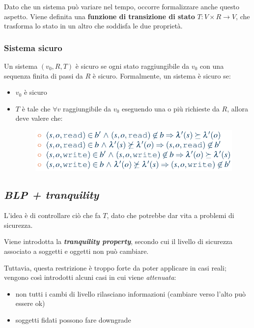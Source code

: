 \documentclass{report}
\begin{document}
\noindent Dato che un sistema può variare nel tempo, occorre formalizzare anche questo aspetto.
Viene definita una \textbf{funzione di transizione di stato} $T: V \times R \rightarrow V$, che 
trasforma lo stato in un altro che soddisfa le due proprietà.

\subsubsection{Sistema sicuro}

Un sistema $(v_0, R, T)$ è sicuro se ogni stato raggiungibile da $v_0$ con una sequenza finita di 
passi da $R$ è sicuro. Formalmente, un sistema è sicuro se:
\begin{itemize}
    \item $v_0$ è sicuro 
    \item $T$ è tale che $\forall v$ raggiungibile da $v_0$ eseguendo una o più richieste 
    da $R$, allora deve valere che:
    \begin{figure}[H]
        \centering
        \includegraphics[width=0.8\linewidth]{images/blp-ss.png}
    \end{figure}
\end{itemize}

\subsection{\textit{BLP + tranquility}}

L'idea è di controllare ciò che fa $T$, dato che potrebbe dar vita 
a problemi di sicurezza.

\noindent Viene introdotta la \textit{\textbf{tranquility property}}, secondo cui 
il livello di sicurezza associato a soggetti e oggetti non può cambiare.

\noindent Tuttavia, questa restrizione è troppo forte da poter applicare in casi reali;
vengono così introdotti alcuni casi in cui viene \textit{attenuata}:
\begin{itemize}
    \item non tutti i cambi di livello rilasciano informazioni (cambiare verso l'alto può essere ok)
    \item soggetti fidati possono fare downgrade
\end{itemize}
\end{document}

